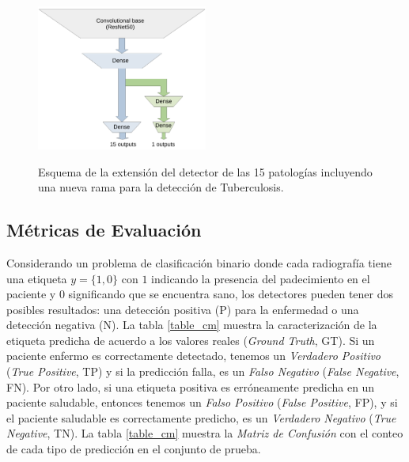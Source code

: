 \begin{figure}[htp]
    \centering
    {\includegraphics[width=0.5\textwidth]{Chapters/4. ViT-Lung/images/tb_net.pdf}}
\caption{ Esquema de la extensión del detector de las 15 patologías incluyendo una nueva rama para
          la detección de Tuberculosis.}
\label{net_tb}
\end{figure}


\subsection{Métricas de Evaluación} \label{sec_metrics}

Considerando un problema de clasificación binario donde cada radiografía tiene una etiqueta
$y = \{1, 0\}$ con $1$ indicando la presencia del padecimiento en el paciente y $0$ significando
que se encuentra sano, los detectores pueden tener dos posibles resultados: una detección positiva (P)
para la enfermedad o una detección negativa (N). La tabla \ref{table_cm} muestra la caracterización
de la etiqueta predicha de acuerdo a los valores reales (\textit{Ground Truth}, GT). Si un paciente
enfermo es correctamente detectado, tenemos un \textit{Verdadero Positivo} (\textit{True Positive}, TP)
y si la predicción falla, es un \textit{Falso Negativo} (\textit{False Negative}, FN). Por otro lado,
si una etiqueta positiva es erróneamente predicha en un paciente saludable, entonces tenemos un
\textit{Falso Positivo} (\textit{False Positive}, FP), y si el paciente saludable es correctamente
predicho, es un \textit{Verdadero Negativo} (\textit{True Negative}, TN). La tabla \ref{table_cm}
muestra la \textit{Matriz de Confusión} con el conteo de cada tipo de predicción en el conjunto de
prueba.


